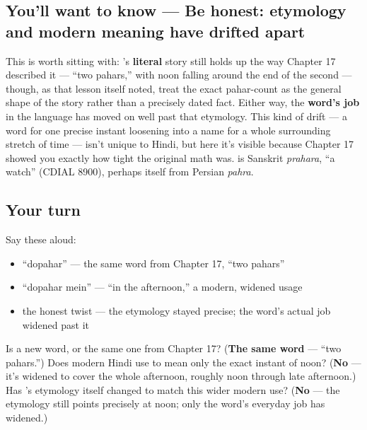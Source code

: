 \subsection*{You'll want to know — Be honest: etymology and modern meaning have drifted apart}
This is worth sitting with: 's \textbf{literal} story still holds up the way Chapter 17 described it — \textquotedblleft{}two pahars,\textquotedblright{} with noon falling around the end of the second — though, as that lesson itself noted, treat the exact pahar-count as the general shape of the story rather than a precisely dated fact. Either way, the \textbf{word's job} in the language has moved on well past that etymology. This kind of drift — a word for one precise instant loosening into a name for a whole surrounding stretch of time — isn't unique to Hindi, but here it's visible because Chapter 17 showed you exactly how tight the original math was. \textbf{} is Sanskrit \emph{prahara}, \textquotedblleft{}a watch\textquotedblright{} (CDIAL 8900), perhaps itself from Persian \emph{pahra}.

\subsection*{Your turn}
Say these aloud:

\begin{itemize}
\raggedright
  \item \textquotedblleft{}dopahar\textquotedblright{} — the same word from Chapter 17, \textquotedblleft{}two pahars\textquotedblright{}
  \item \textquotedblleft{}dopahar mein\textquotedblright{} — \textquotedblleft{}in the afternoon,\textquotedblright{} a modern, widened usage
  \item the honest twist — the etymology stayed precise; the word's actual job widened past it
\end{itemize}

\begin{tcolorbox}[breakable,colback=teal!4,colframe=teal!35!black,title={Before you move on}]
Is  a new word, or the same one from Chapter 17? (\textbf{The same word} — \textquotedblleft{}two pahars.\textquotedblright{}) Does modern Hindi use  to mean only the exact instant of noon? (\textbf{No} — it's widened to cover the whole afternoon, roughly noon through late afternoon.) Has 's etymology itself changed to match this wider modern use? (\textbf{No} — the etymology still points precisely at noon; only the word's everyday job has widened.)
\end{tcolorbox}

